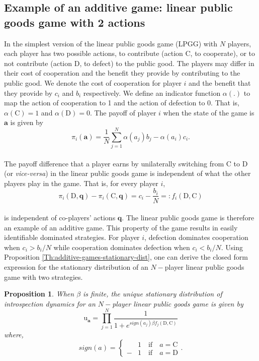 \documentclass[11pt]{article}
\theoremstyle{plainCl1}
\newtheorem{Prop}{Proposition}
\theoremstyle{plainCl2}
\newcommand{\abf}{\mathbf{a}}
\newcommand{\qbf}{\mathbf{q}}
\newcommand{\C}{\mathrm{C}}
\newcommand{\D}{\mathrm{D}}
\begin{document}
\subsection{Example of an additive game: linear public goods game with 2 actions}
In the simplest version of the linear public goods game (LPGG) with $N$ players, each player has two possible actions, to contribute (action $\C$, to cooperate), or to not contribute (action $\D$, to defect) to the public good. The players may differ in their cost of cooperation and the benefit they provide by contributing to the public good. We denote the cost of cooperation for player $i$ and the benefit that they provide by $c_i$ and $b_i$ respectively. We define an indicator function $\alpha(.)$ to map the action of cooperation to 1 and the action of defection to 0. That is, $\alpha(\C) = 1$ and $\alpha(\D) = 0$.  The payoff of player $i$ when the state of the game is $\abf$ is given by \\
\begin{equation}
\pi_i(\abf) = \frac{1}{N}\sum_{j=1}^N \displaystyle \alpha(a_j) b_j - \alpha(a_i) c_i .
\label{Eq:linear-pgg-payoff}
\end{equation}
\\
\noindent The payoff difference that a player earns by unilaterally switching from $\C$ to $\D$ (or \emph{vice-versa}) in the linear public goods game is independent of what the other players play in the game. That is, for every player $i$,
\begin{equation}
\pi_i(\D, \qbf) - \pi_i(\C, \qbf) = c_i - \frac{b_i}{N} =: f_i(\D, \C) 
\label{Eq:difference-payoffs-lpgg}
\end{equation}\\
\noindent is independent of co-players' actions $\qbf$. The linear public goods game is therefore an example of an additive game. This property of the game results in easily identifiable dominated strategies. For player $i$, defection dominates cooperation when $c_i > b_i/N$ while cooperation dominates defection when $c_i < b_i/N$. Using Proposition \ref{Th:additive-games-stationary-dist}, one can derive the closed form expression for the stationary distribution of an $N-$player linear public goods game with two strategies. 
\begin{Prop}
\label{prop:stationary-dist-lpgg}
When $\beta$ is finite, the unique stationary distribution of introspection dynamics for an $N-$player linear public goods game is given by
\\
\begin{equation}
\mathrm{u}_\abf = \prod_{j = 1}^{N} \frac{1}{1 + \displaystyle e^{\mathit{sign}(a_j)\beta f_j(\D, \C )}} 
\label{Eq:stationary_dist_lpgg}
\end{equation}
where, 
\begin{equation}
\label{Eq:sign-function}
\mathit{sign}(a) =
\begin{cases}
&1 \quad \text{if} \quad a = \C \\
-&1 \quad \text{if} \quad a = \D
\end{cases}.
\end{equation} \\
\end{Prop}
\end{document}
